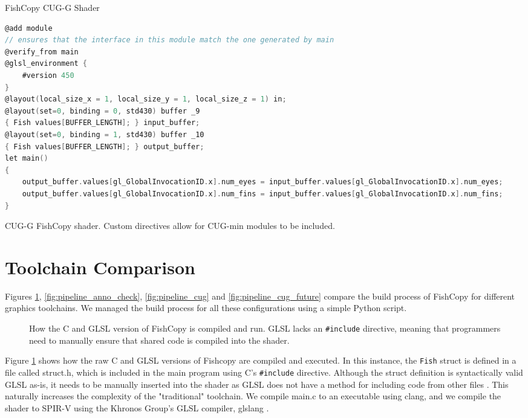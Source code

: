 \documentclass[a4paper,12pt,twoside,openright]{report}
\begin{document}
\begin{lstfloat}
\begin{center}
FishCopy CUG-G Shader
\end{center}
\begin{lstlisting}[language=C]
@add module
// ensures that the interface in this module match the one generated by main
@verify_from main
@glsl_environment {
    #version 450
}
@layout(local_size_x = 1, local_size_y = 1, local_size_z = 1) in;
@layout(set=0, binding = 0, std430) buffer _9
{ Fish values[BUFFER_LENGTH]; } input_buffer;
@layout(set=0, binding = 1, std430) buffer _10
{ Fish values[BUFFER_LENGTH]; } output_buffer;
let main()
{
    output_buffer.values[gl_GlobalInvocationID.x].num_eyes = input_buffer.values[gl_GlobalInvocationID.x].num_eyes;
    output_buffer.values[gl_GlobalInvocationID.x].num_fins = input_buffer.values[gl_GlobalInvocationID.x].num_fins;
}
\end{lstlisting}
\caption{CUG-G FishCopy shader. Custom directives allow for CUG-min modules to
be included. }
\label{lst:cug_g_shader}
\end{lstfloat}



\section{Toolchain Comparison}

\label{sec:toolchain_comparison}

Figures \ref{fig:pipeline_basic}, \ref{fig:pipeline_anno_check},
\ref{fig:pipeline_cug} and \ref{fig:pipeline_cug_future} compare the build
process of FishCopy for different graphics toolchains. We managed the build
process for all these configurations using a simple Python script.

\begin{figure}[h]
\centering
\def\svgwidth{0.8\linewidth}

\caption{How the C and GLSL version of FishCopy is compiled and run. GLSL lacks
an \texttt{\#include} directive, meaning that programmers need to manually
ensure that shared code is compiled into the shader.}
\label{fig:pipeline_basic}
\end{figure}

Figure \ref{fig:pipeline_basic} shows how the raw C and GLSL versions of
Fishcopy are compiled and executed. In this instance, the \texttt{Fish} struct
is defined in a file called struct.h, which is included in the main program
using C's \texttt{\#include} directive. Although the struct definition is
syntactically valid GLSL as-is, it needs to be manually inserted into the
shader as GLSL does not have a method for including code from other files
\cite{TODO}. This naturally increases the complexity of the "traditional"
toolchain. We compile main.c to an executable using clang, and we compile the
shader to SPIR-V using the Khronos Group's GLSL compiler, glslang \cite{TODO}.
\end{document}
